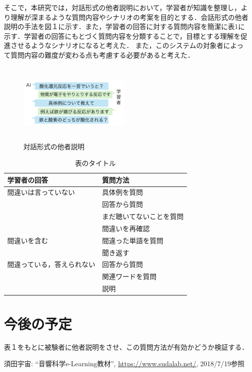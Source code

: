\documentclass[twocolumn,10pt,a4j]{ltjsarticle}
\begin{document}
そこで，本研究では，対話形式の他者説明において，学習者が知識を整理し，より理解が深まるような質問内容やシナリオの考案を目的とする．会話形式の他者説明の手法を図１に示す．また，学習者の回答に対する質問内容を簡潔に表1に示す．学習者の回答にもとづく質問内容を分類することで，目標とする理解を促進させるようなシナリオになると考えた．
また，このシステムの対象者によって質問内容の難度が変わる点も考慮する必要があると考えた．

\begin{figure}[h]
\begin{center}
 \includegraphics[clip,width=55mm,height=40mm]{talk_log.pdf}
\end{center}
 \caption{対話形式の他者説明}
 \label{fig:図形}
\end{figure}


\begin{table}[h]
\begin{center}
\label{tab:hogehoge}
\begin{tabular}{ll}

\hline

        \multicolumn{1}{l}{学習者の回答} & \multicolumn{1}{l}{質問方法}  \\  \hline \hline 
        \multicolumn{1}{l}{間違いは言っていない} & \multicolumn{1}{l}{具体例を質問} \\ 
         \multicolumn{1}{l}{} & \multicolumn{1}{l}{回答から質問} \\ 
          \multicolumn{1}{l}{} & \multicolumn{1}{l}{まだ聴いてないことを質問} \\ 
          \multicolumn{1}{l}{} & \multicolumn{1}{l}{間違いを再確認} \\ \hline
          \multicolumn{1}{l}{間違いを含む} & \multicolumn{1}{l}{間違った単語を質問} \\
          \multicolumn{1}{l}{} & \multicolumn{1}{l}{聞き返す} \\ \hline
           \multicolumn{1}{l}{間違っている，答えられない} & \multicolumn{1}{l}{回答から質問} \\
          \multicolumn{1}{l}{} & \multicolumn{1}{l}{関連ワードを質問} \\ 
          \multicolumn{1}{l}{} & \multicolumn{1}{l}{説明} \\ \hline
                 
\end{tabular}
\end{center}
\caption{表のタイトル}
\end{table}

\section{今後の予定}
表１をもとに被験者に他者説明をさせ、この質問方法が有効かどうか検証する．





\begin{thebibliography}{99}
 須田宇宙: ``音響科学e-Learning教材'', \url{https://www.sudalab.net/}, 2018/7/19参照
\end{thebibliography}
\end{document}
